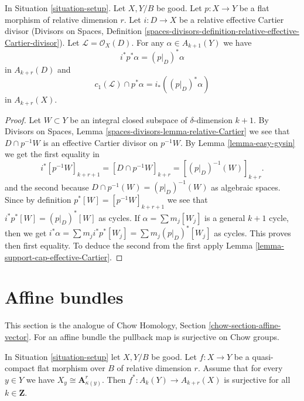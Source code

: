 \begin{lemma}
\label{lemma-relative-effective-cartier}
In Situation \ref{situation-setup}. Let $X, Y/B$ be good.
Let $p : X \to Y$ be a flat morphism of relative dimension $r$.
Let $i : D \to X$ be a relative effective Cartier divisor
(Divisors on Spaces, Definition
\ref{spaces-divisors-definition-relative-effective-Cartier-divisor}).
Let $\mathcal{L} = \mathcal{O}_X(D)$.
For any $\alpha \in A_{k + 1}(Y)$ we have
$$
i^*p^*\alpha = (p|_D)^*\alpha
$$
in $A_{k + r}(D)$ and
$$
c_1(\mathcal{L}) \cap p^*\alpha = i_* ((p|_D)^*\alpha)
$$
in $A_{k + r}(X)$.
\end{lemma}

\begin{proof}
Let $W \subset Y$ be an integral closed subspace of $\delta$-dimension
$k + 1$. By Divisors on Spaces, Lemma
\ref{spaces-divisors-lemma-relative-Cartier}
we see that $D \cap p^{-1}W$ is an effective
Cartier divisor on $p^{-1}W$. By Lemma \ref{lemma-easy-gysin}
we get the first equality in
$$
i^*[p^{-1}W]_{k + r + 1} =
[D \cap p^{-1}W]_{k + r} =
[(p|_D)^{-1}(W)]_{k + r}.
$$
and the second because $D \cap p^{-1}(W) = (p|_D)^{-1}(W)$ as algebraic spaces.
Since by definition $p^*[W] = [p^{-1}W]_{k + r + 1}$ we see that
$i^*p^*[W] = (p|_D)^*[W]$ as cycles. If $\alpha = \sum m_j[W_j]$ is a
general $k + 1$ cycle, then we get
$i^*\alpha = \sum m_j i^*p^*[W_j] = \sum m_j(p|_D)^*[W_j]$ as cycles.
This proves then first equality. To deduce the second from the
first apply Lemma \ref{lemma-support-cap-effective-Cartier}.
\end{proof}












\section{Affine bundles}
\label{section-affine-vector}

\noindent
This section is the analogue of
Chow Homology, Section \ref{chow-section-affine-vector}.
For an affine bundle the pullback map is surjective on Chow groups.

\begin{lemma}
\label{lemma-pullback-affine-fibres-surjective}
In Situation \ref{situation-setup} let $X, Y/B$ be good.
Let $f : X \to Y$ be a quasi-compact flat morphism over $B$
of relative dimension $r$. Assume that for every $y \in Y$ we have
$X_y \cong \mathbf{A}^r_{\kappa(y)}$.
Then $f^* : A_k(Y) \to A_{k + r}(X)$ is surjective for all
$k \in \mathbf{Z}$.
\end{lemma}

